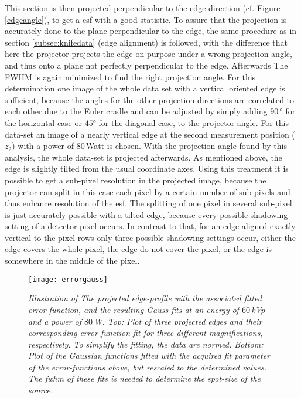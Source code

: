 This section is then projected perpendicular to the edge direction (cf. Figure \ref{edgeangle}), to get a \gls{esf} with a good statistic. To assure that the projection is accurately done to the plane perpendicular to the edge, the same procedure as in section \ref{subsec:knifedata} (edge alignment) is followed, with the difference that here the projector projects the edge on purpose under a wrong projection angle, and thus onto a plane not perfectly perpendicular to the edge. Afterwards The FWHM is again minimized to find the right projection angle. For this determination one image of the whole data set with a vertical oriented edge is sufficient, because the angles for the other projection directions are correlated to each other due to the Euler cradle and can be adjusted by simply adding $90\,$° for the horizontal case or $45$° for the diagonal case, to the projector angle. For this data-set an image of a nearly vertical edge at the second measurement position ($z_{2}$) with a power of $80\,$Watt is chosen. With the projection angle found by this analysis, the whole data-set is projected afterwards. As mentioned above, the edge is slightly tilted from the usual coordinate axes. Using this treatment it is possible to get a sub-pixel resolution in the projected image, because the projector can split in this case each pixel by a certain number of sub-pixels and thus enhance resolution of the \gls{esf}. The splitting of one pixel in several sub-pixel is just accurately possible with a tilted edge, because every possible shadowing setting of a detector pixel occurs. In contrast to that, for an edge aligned exactly vertical to the pixel rows only three possible shadowing settings occur, either the edge covers the whole pixel, the edge do not cover the pixel, or the edge is somewhere in the middle of the pixel.\\
\begin{figure}[h]
	\begin{center}
		\texttt{[image: errorgauss]}
	\end{center}
	\caption[Fit of the projection of the projected edge and corresponding Gauss-fits]{\textit{Illustration of The projected edge-profile with the associated fitted error-function, and the resulting Gauss-fits at an energy of $60\,$kVp and a power of $80\,$W. Top: Plot of three projected edges and their corresponding error-function fit for three different magnifications, respectively. To simplify the fitting, the data are normed. Bottom: Plot of the Gaussian functions fitted with the acquired fit parameter of the error-functions above, but rescaled to the determined values. The \gls{fwhm} of these fits is needed to determine the spot-size of the source.}}
	\label{errorgauss}
\end{figure}


